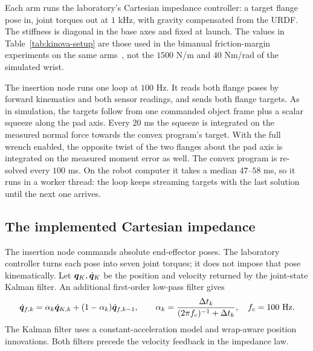 Each arm runs the laboratory's Cartesian impedance controller: a target flange pose in, joint torques out at $1$ kHz, with gravity compensated from the URDF. The stiffness is diagonal in the base axes and fixed at launch. The values in Table~\ref{tab:kinova-setup} are those used in the bimanual friction-margin experiments on the same arms~\cite{frictioncone2026}, not the $1500$ N/m and $40$ Nm/rad of the simulated wrist.

The insertion node runs one loop at $100$ Hz. It reads both flange poses by forward kinematics and both sensor readings, and sends both flange targets. As in simulation, the targets follow from one commanded object frame plus a scalar squeeze along the pad axis. Every $20$ ms the squeeze is integrated on the measured normal force towards the convex program's target. With the full wrench enabled, the opposite twist of the two flanges about the pad axis is integrated on the measured moment error as well. The convex program is re-solved every $100$ ms. On the robot computer it takes a median $47$--$58$ ms, so it runs in a worker thread: the loop keeps streaming targets with the last solution until the next one arrives.

\subsection{The implemented Cartesian impedance}
\label{sec:kinova-impedance}

The insertion node commands absolute end-effector poses. The laboratory controller turns each pose into seven joint torques; it does not impose that pose kinematically. Let $\bm{q}_K,\dot{\bm{q}}_K$ be the position and velocity returned by the joint-state Kalman filter. An additional first-order low-pass filter gives
\begin{equation}
\dot{\bm{q}}_{f,k}=\alpha_k\dot{\bm{q}}_{K,k}+(1-\alpha_k)\dot{\bm{q}}_{f,k-1},
\qquad \alpha_k=\frac{\Delta t_k}{(2\pi f_c)^{-1}+\Delta t_k},
\quad f_c=100\ \mathrm{Hz}.
\end{equation}
The Kalman filter uses a constant-acceleration model and wrap-aware position innovations. Both filters precede the velocity feedback in the impedance law.

